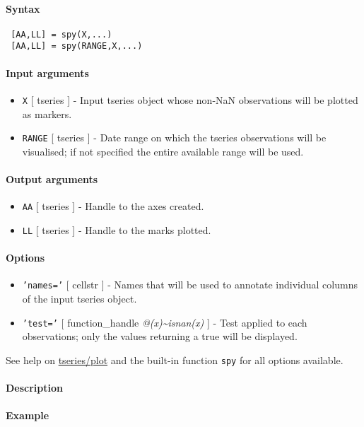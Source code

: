 


	\paragraph{Syntax}
 
 \begin{verbatim}
 [AA,LL] = spy(X,...)
 [AA,LL] = spy(RANGE,X,...)
 \end{verbatim}
 
 \paragraph{Input arguments}
 
 \begin{itemize}
 \item
   \texttt{X} {[} tseries {]} - Input tseries object whose non-NaN
   observations will be plotted as markers.
 \item
   \texttt{RANGE} {[} tseries {]} - Date range on which the tseries
   observations will be visualised; if not specified the entire available
   range will be used.
 \end{itemize}
 
 \paragraph{Output arguments}
 
 \begin{itemize}
 \item
   \texttt{AA} {[} tseries {]} - Handle to the axes created.
 \item
   \texttt{LL} {[} tseries {]} - Handle to the marks plotted.
 \end{itemize}
 
 \paragraph{Options}
 
 \begin{itemize}
 \item
   \texttt{'names='} {[} cellstr {]} - Names that will be used to
   annotate individual columns of the input tseries object.
 \item
   \texttt{'test='} {[} function\_handle \textbar{}
   \emph{@(x)\textasciitilde{}isnan(x)} {]} - Test applied to each
   observations; only the values returning a true will be displayed.
 \end{itemize}
 
 See help on \url{tseries/plot} and the built-in function \texttt{spy}
 for all options available.
 
 \paragraph{Description}
 
 \paragraph{Example}


